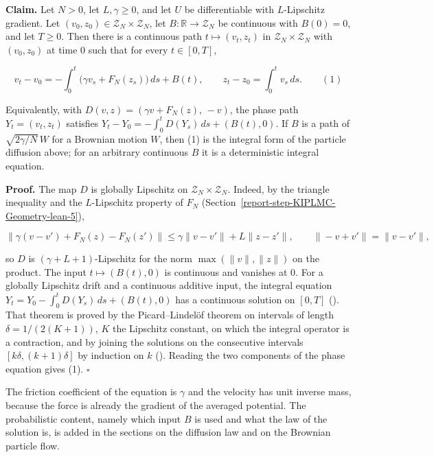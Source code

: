 \documentclass[11pt,a4paper]{report}
\begin{document}
\textbf{Claim.} Let \(N>0\), let \(L,\gamma\ge0\), and let \(U\) be differentiable with \(L\)-Lipschitz gradient. Let \((v_0,z_0)\in\mathcal Z_N\times\mathcal Z_N\), let \(B:\mathbb R\to\mathcal Z_N\) be continuous with \(B(0)=0\), and let \(T\ge0\). Then there is a continuous path \(t\mapsto(v_t,z_t)\) in \(\mathcal Z_N\times\mathcal Z_N\) with \((v_0,z_0)\) at time \(0\) such that for every \(t\in[0,T]\),


\[v_t-v_0=-\int_0^t\bigl(\gamma v_s+F_N(z_s)\bigr)\,ds+B(t),\qquad z_t-z_0=\int_0^tv_s\,ds.\qquad(1)\]


Equivalently, with \(D(v,z)=(\gamma v+F_N(z),\,-v)\), the phase path \(Y_t=(v_t,z_t)\) satisfies \(Y_t-Y_0=-\int_0^tD(Y_s)\,ds+(B(t),0)\). If \(B\) is a path of \(\sqrt{2\gamma/N}\,W\) for a Brownian motion \(W\), then (1) is the integral form of the particle diffusion above; for an arbitrary continuous \(B\) it is a deterministic integral equation.




\textbf{Proof.} The map \(D\) is globally Lipschitz on \(\mathcal Z_N\times\mathcal Z_N\). Indeed, by the triangle inequality and the \(L\)-Lipschitz property of \(F_N\) (Section~\ref{report-step-KIPLMC-Geometry-lean-5}),


\[\|\gamma(v-v')+F_N(z)-F_N(z')\|\le\gamma\|v-v'\|+L\|z-z'\|,\qquad\|-v+v'\|=\|v-v'\|,\]


so \(D\) is \((\gamma+L+1)\)-Lipschitz for the norm \(\max(\|v\|,\|z\|)\) on the product. The input \(t\mapsto(B(t),0)\) is continuous and vanishes at \(0\). For a globally Lipschitz drift and a continuous additive input, the integral equation \(Y_t=Y_0-\int_0^tD(Y_s)\,ds+(B(t),0)\) has a continuous solution on \([0,T]\) (\cite[Section~3.1.3]{LangevinLean2026Kinetic}). That theorem is proved by the Picard–Lindelöf theorem on intervals of length \(\delta=1/(2(K+1))\), \(K\) the Lipschitz constant, on which the integral operator is a contraction, and by joining the solutions on the consecutive intervals \([k\delta,(k+1)\delta]\) by induction on \(k\) (\cite[Section~3.14.3]{LangevinLean2026ULASC}). Reading the two components of the phase equation gives (1). \(\square\)




The friction coefficient of the equation is \(\gamma\) and the velocity has unit inverse mass, because the force is already the gradient of the averaged potential. The probabilistic content, namely which input \(B\) is used and what the law of the solution is, is added in the sections on the diffusion law and on the Brownian particle flow.
\end{document}
